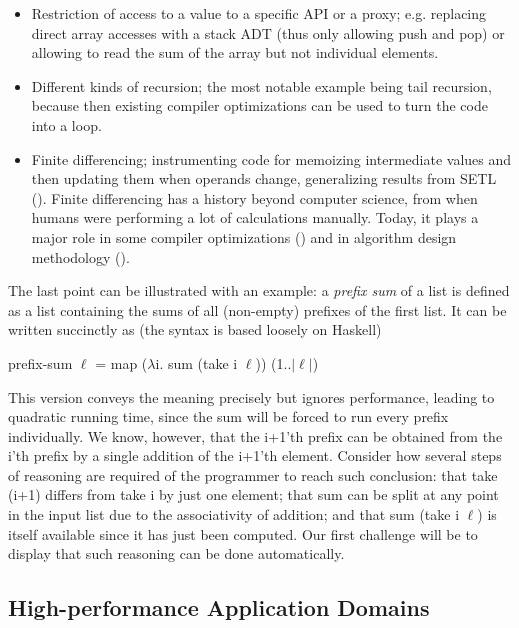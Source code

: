 \begin{itemize}
  \item Restriction of access to a value to a specific API or a proxy;
    e.g. replacing direct array accesses with a stack ADT (thus only allowing push and pop)
    or allowing to read the sum of the array but not individual elements.
  \item Different kinds of recursion; the most notable example being
    tail recursion, because then existing compiler optimizations can be
    used to turn the code into a loop.
  \item Finite differencing; instrumenting code for memoizing intermediate
    values and then updating them when operands change, generalizing results
    from SETL (\cite{TOPLAS1982/Paige,ESOP1990/Paige}).
    Finite differencing has a history beyond computer science, from when
    humans were performing a lot of calculations manually.
    Today, it plays a major role in some compiler optimizations
    (\cite{CACM1997/Cocke})
    and in algorithm design methodology (\cite{Book1997/Dijkstra,VHLL1974/Earley}).
\end{itemize}

The last point can be illustrated with an example: a \emph{prefix sum} of a list
is defined as a list containing the sums of all (non-empty) prefixes of the
first list.
It can be written succinctly as (the syntax is based loosely on Haskell)
\begin{center}
\textsf{prefix-sum $\ell$ = map ($\lambda$i. sum (take i $\ell$)) (1..$|\ell|$)}
\end{center}

This version conveys the meaning precisely but ignores performance, leading to
quadratic running time, since the \textsf{sum} will be forced to run every prefix
individually.
We know, however, that the \textsf{i+1}'th prefix can be obtained from the \textsf{i}'th
prefix by a single addition of the \textsf{i+1}'th element.
Consider how several steps of reasoning are required of the programmer to reach such
conclusion: that \textsf{take (i+1)} differs from \textsf{take i} by just one element;
that \textsf{sum} can be split at any point in the input list due to the associativity
of addition; and that \textsf{sum (take i $\ell$)} is itself available since it has
just been computed.
Our first challenge will be to display that such reasoning can be done automatically.


\subsection{High-performance Application Domains}

